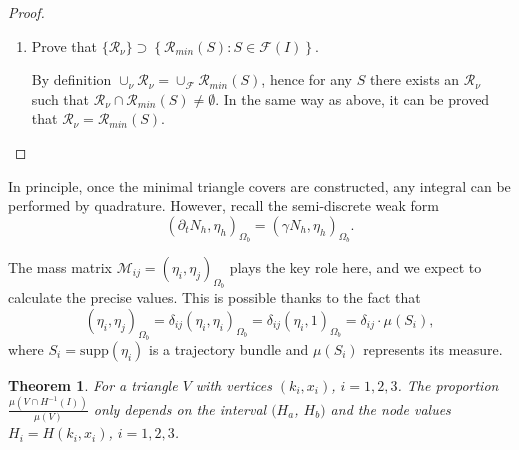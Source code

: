 \documentclass{article}
\newtheorem{theorem}{Theorem}
\numberwithin{equation}{section}
\begin{document}
\begin{proof}
\begin{enumerate}
        \item Prove that $\{\mathcal{R}_{\nu}\} \supset \left\{ \mathcal{R}_{min}(S):S\in\mathcal{F}(I)\right\} $.

        By definition $\cup_{\nu} \mathcal{R}_{\nu} = \cup_{\mathcal{F}} \mathcal{R}_{min}(S)$, hence for any $S$ there exists an $\mathcal{R}_{\nu}$ such that $\mathcal{R}_{\nu} \cap \mathcal{R}_{min}(S) \neq \emptyset$. In the same way as above, it can be proved that $\mathcal{R}_{\nu}=\mathcal{R}_{min}(S)$.
    \end{enumerate}
\end{proof}

In principle, once the minimal triangle covers are constructed, any integral can be performed by quadrature. However, recall the semi-discrete weak form 
\begin{equation*}
\left(\partial_{t}N_{h},\eta_{h}\right)_{\Omega_{b}}=\left(\gamma N_{h},\eta_{h}\right)_{\Omega_{b}}.
\end{equation*}

The mass matrix $\mathcal{M}_{ij} = \left(\eta_{i}, \eta_{j}\right)_{\Omega_{b}}$ plays the key role here, and we expect to calculate the precise values. This is possible thanks to the fact that 
\begin{equation*}
    \left(\eta_{i},\eta_{j}\right)_{\Omega_{b}}=\delta_{ij}\left(\eta_{i},\eta_{i}\right)_{\Omega_{b}} = \delta_{ij}\left(\eta_{i},1\right)_{\Omega_{b}} = \delta_{ij} \cdot \mu \left(S_{i}\right),
\end{equation*}
where $S_{i} = \text{supp}\left(\eta_{i}\right)$ is a trajectory bundle and $\mu(S_{i})$ represents its measure.

\begin{theorem}
    For a triangle $V$ with vertices $(k_{i}, x_{i})$, $i=1,2,3$. The proportion $\frac{\mu(V\cap H^{-1}(I))}{\mu(V)}$ only depends on the interval $(H_{a}$, $H_{b})$ and the node values $H_{i}= H(k_{i}, x_{i})$, $i=1,2,3$.
\end{theorem}
\end{document}

